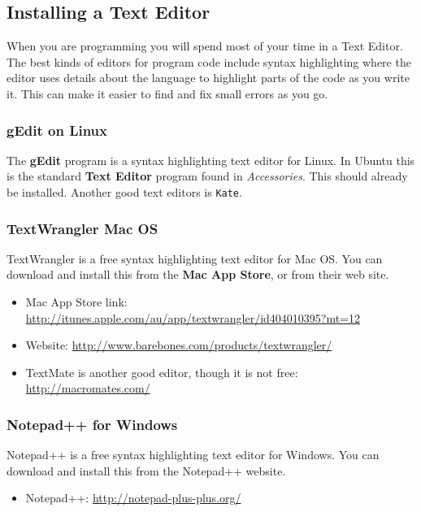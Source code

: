 \clearpage
\subsection{Installing a Text Editor} %
\label{sub:installing_a_text_editor}

When you are programming you will spend most of your time in a Text Editor. The best kinds of editors for program code include syntax highlighting where the editor uses details about the language to highlight parts of the code as you write it. This can make it easier to find and fix small errors as you go.

\subsubsection{gEdit on Linux} %
\label{ssub:gedit_on_linux}

The \textbf{gEdit} program is a syntax highlighting text editor for Linux. In Ubuntu this is the standard \textbf{Text Editor} program found in \emph{Accessories}. This should already be installed. Another good text editors is \texttt{Kate}.


\subsubsection{TextWrangler Mac OS} %
\label{ssub:textwrangler_or_textmate_on_mac_os}

TextWrangler is a free syntax highlighting text editor for Mac OS. You can download and install this from the \textbf{Mac App Store}, or from their web site.

\begin{itemize}
  \item Mac App Store link: \url{http://itunes.apple.com/au/app/textwrangler/id404010395?mt=12}
  \item Website: \url{http://www.barebones.com/products/textwrangler/}
  \item TextMate is another good editor, though it is not free: \url{http://macromates.com/}
\end{itemize}


\subsubsection{Notepad++ for Windows} %
\label{ssub:notepad_for_windows}

Notepad++ is a free syntax highlighting text editor for Windows. You can download and install this from the Notepad++ website.

\begin{itemize}
  \item Notepad++: \url{http://notepad-plus-plus.org/}
\end{itemize}


